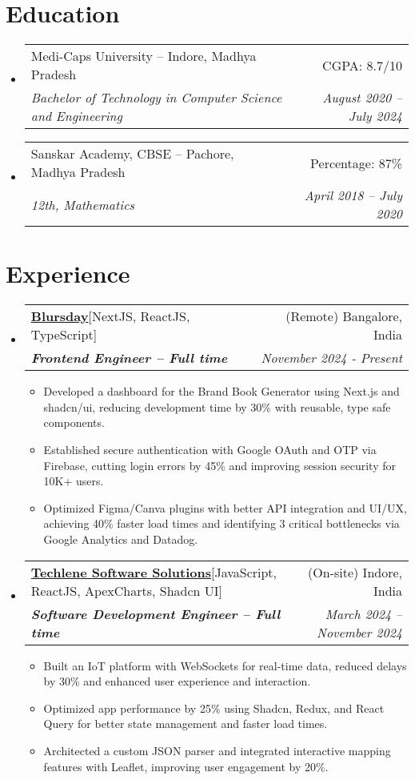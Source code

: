 \documentclass[letterpaper,10pt]{article}
\makeatletter
\newcommand{\resumeItem}[1]{
    \item\small{
      {#1 \vspace{-2pt}}
    }
  }
\newcommand{\resumeSubheading}[4]{
    \vspace{-2pt}\item
      \begin{tabular*}{0.97\textwidth}[t]{l@{\extracolsep{\fill}}r}
        {#1} & #2 \\
        \textit{\small#3} & \textit{\small #4}\\
      \end{tabular*}\vspace{-7pt}
  }
\newcommand{\resumeSubHeadingListStart}{\begin{itemize}[leftmargin=0.15in, label={}]}
\newcommand{\resumeSubHeadingListEnd}{\end{itemize}}
\newcommand{\resumeItemListStart}{\begin{itemize}}
\newcommand{\resumeItemListEnd}{\end{itemize}\vspace{-5pt}}
\makeatother
\begin{document}
\section{Education}
\resumeSubHeadingListStart

\resumeSubheading
{Medi-Caps University -- Indore, Madhya Pradesh}{CGPA: 8.7/10}
  {Bachelor of Technology in Computer Science and Engineering}{August 2020 -- July 2024}
\resumeSubHeadingListEnd

\resumeSubHeadingListStart
\resumeSubheading
  {Sanskar Academy, CBSE -- Pachore, Madhya Pradesh}{Percentage: 87\%}
  {12th, Mathematics}{April 2018 -- July 2020}

\resumeSubHeadingListEnd




\section{Experience}

\resumeSubHeadingListStart
\resumeSubheading
{\textbf{\href{https://www.blursday.ai/}{Blursday}\hspace{5pt}}{{[NextJS, ReactJS, TypeScript]}}}{(Remote) Bangalore, India}
{\textbf{Frontend Engineer – Full time}}{November 2024 - Present }
\resumeItemListStart
\resumeItem{Developed a dashboard for the Brand Book Generator using Next.js and shadcn/ui, reducing development time by 30\% with reusable, type safe components.
}
\resumeItem{Established secure authentication with Google OAuth and OTP via Firebase, cutting login errors by 45\% and improving session security for 10K+ users.
}
\resumeItem{Optimized Figma/Canva plugins with better API integration and UI/UX, achieving 40\% faster load times and identifying 3 critical bottlenecks via Google Analytics and Datadog.
}
\resumeItemListEnd
\resumeSubHeadingListEnd


\resumeSubHeadingListStart
\resumeSubheading
  {\textbf{\href{https://www.techlene.com/}{Techlene Software Solutions}\hspace{5pt}}{[JavaScript, ReactJS, ApexCharts, Shadcn UI]}}{(On-site) Indore, India}
  {\textbf{Software Development Engineer – Full time}}{March 2024 -- November 2024}
  \resumeItemListStart
    \resumeItem{Built an IoT platform with WebSockets for real-time data, reduced delays by 30\% and enhanced user experience and interaction.}
    \resumeItem{Optimized app performance by 25\% using Shadcn, Redux, and React Query for better state management and faster load times.}
    \resumeItem{Architected a custom JSON parser and integrated interactive mapping features with Leaflet, improving user engagement by 20\%.}
  \resumeItemListEnd
\resumeSubHeadingListEnd
\end{document}
